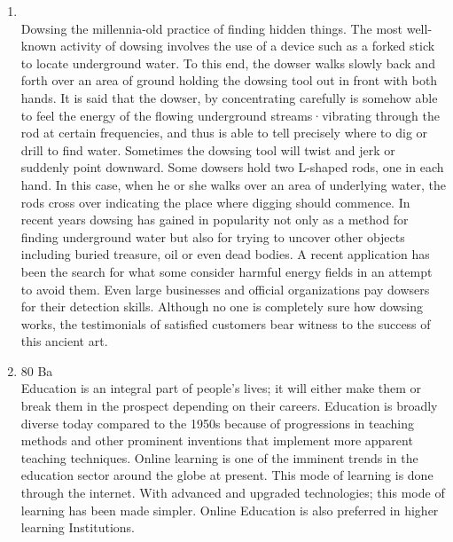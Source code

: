 \documentclass[12pt]{article}
\begin{document}
\begin{enumerate}
      The practice of 'streaming', or "tracking", involves separating students into classes depending on their diagnosed levels of attainment. At a macro level, it requires the establishment of academically selective schools for the brightest students and comprehensive schools for the rest. Within schools, it means selecting students into a 'stream' of general ability, or "sets of subject-specific ability. The practice is intuitively appealing to almost every stakeholder.

    \item {}\\
      Dowsing the millennia-old practice of finding hidden things. The most well-known activity of dowsing involves the use of a device such as a forked stick to locate underground water. To this end, the dowser walks slowly back and forth over an area of ground holding the dowsing tool out in front with both hands. It is said that the dowser, by concentrating carefully is somehow able to feel the energy of the flowing underground streams·vibrating through the rod at certain frequencies, and thus is able to tell precisely where to dig or drill to find water. Sometimes the dowsing tool will twist and jerk or suddenly point downward. Some dowsers hold two L-shaped rods, one in each hand. In this case, when he or she walks over an area of underlying water, the rods cross over indicating the place where digging should commence. In recent years dowsing has gained in popularity not only as a method for finding underground water but also for trying to uncover other objects including buried treasure, oil or even dead bodies. A recent application has been the search for what some consider harmful energy fields in an attempt to avoid them. Even large businesses and official organizations pay dowsers for their detection skills. Although no one is completely sure how dowsing works, the testimonials of satisfied customers bear witness to the success of this ancient art.

    \item 80 Ba\\
      Education is an integral part of people’s lives; it will either make them or break them in the prospect depending on their careers. Education is broadly diverse today compared to the 1950s because of progressions in teaching methods and other prominent inventions that implement more apparent teaching techniques. Online learning is one of the imminent trends in the education sector around the globe at present. This mode of learning is done through the internet. With advanced and upgraded technologies; this mode of learning has been made simpler. Online Education is also preferred in higher learning Institutions.\\


\end{enumerate}
\end{document}
